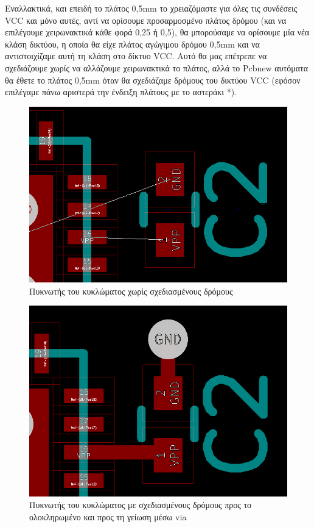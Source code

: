 \documentclass[a4paper]{article}
\begin{document}
Εναλλακτικά, και επειδή το πλάτος 0,5mm το χρειαζόμαστε για όλες τις συνδέσεις VCC και μόνο αυτές,  αντί να ορίσουμε προσαρμοσμένο πλάτος δρόμου (και να  επιλέγουμε χειρωνακτικά κάθε φορά 0,25 ή 0,5), θα μπορούσαμε να ορίσουμε μία νέα κλάση δικτύου, η οποία θα είχε πλάτος αγώγιμου δρόμου 0,5mm και να αντιστοιχίζαμε αυτή τη κλάση στο δίκτυο VCC. Αυτό θα μας επέτρεπε να σχεδιάζουμε χωρίς να αλλάζουμε χειρωνακτικά το πλάτος, αλλά το Pcbnew αυτόματα θα έθετε το πλάτος 0,5mm όταν θα σχεδιάζαμε δρόμους του δικτύου VCC (εφόσον επιλέγαμε πάνω αριστερά την ένδειξη πλάτους με το αστεράκι *). 

\begin{figure}
  \begin{center}
    \includegraphics[width=.5\textwidth]{img/pcb-circ-notrack}
    \caption{Πυκνωτής του κυκλώματος χωρίς σχεδιασμένους δρόμους}
    \label{fig:pcb-circ-notrack}
  \end{center}
\end{figure}

\begin{figure}
  \begin{center}
    \includegraphics[width=.5\textwidth]{img/pcb-circ-track.png}
    \caption{Πυκνωτής του κυκλώματος με σχεδιασμένους δρόμους προς το ολοκληρωμένο και προς τη γείωση μέσω via}
    \label{fig:pcb-circ-track}
  \end{center}
\end{figure}

\end{document}
